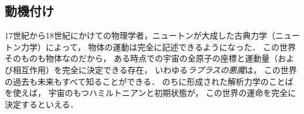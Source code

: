 \documentclass[
]{sotsu}
\begin{document}










\subsection{動機付け}

17世紀から18世紀にかけての物理学者，ニュートンが大成した古典力学（ニュートン力学）によって，
物体の運動は完全に記述できるようになった．
この世界そのものも物体なのだから，
ある時点での宇宙の全原子の座標と運動量（および相互作用）を完全に決定できる存在，
いわゆる\emph{ラプラスの悪魔}は，
この世界の過去も未来もすべて知ることができる．
のちに形成された解析力学のことばを使えば，
宇宙のもつハミルトニアンと初期状態が，
この世界の運命を完全に決定するといえる．
\end{document}
